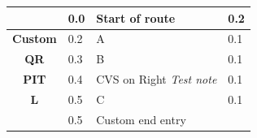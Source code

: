 \documentclass[11pt]{article}
\begin{document}
\renewcommand{\arraystretch}{1.15}
\twocolumn
{}
\tabletail{\hline}
\tablelasttail{\hline}
\begin{center}
  \begin{supertabular}{|c|p{0.30in}|p{2.25in}|l|}
  \hline
{} \textbf{} &   0.0 & Start of route &   0.2 \\ \hline
{} \textbf{Custom} &   0.2 & A &   0.1 \\ \hline
{} \textbf{QR} &   0.3 & B &   0.1 \\ \hline
{} \textbf{PIT} &   0.4 & CVS on Right \newline \textit{Test note} &   0.1 \\ \hline
 \textbf{L} &   0.5 & C &   0.1 \\ \hline
{} \textbf{} &   0.5 & Custom end entry &  \\ \hline

\end{supertabular}
\end{center}
\end{document}

